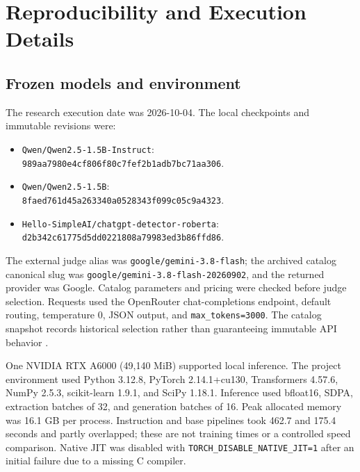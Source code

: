 \section{Reproducibility and Execution Details}\label{sec:reproduce}
\subsection{Frozen models and environment}
The research execution date was 2026-10-04. The local checkpoints and immutable revisions were:
\begin{itemize}[leftmargin=*,itemsep=2pt,topsep=2pt]
\item \texttt{Qwen/Qwen2.5-1.5B-Instruct}:\\\texttt{989aa7980e4cf806f80c7fef2b1adb7bc71aa306}.
\item \texttt{Qwen/Qwen2.5-1.5B}:\\\texttt{8faed761d45a263340a0528343f099c05c9a4323}.
\item \texttt{Hello-SimpleAI/chatgpt-detector-roberta}:\\\texttt{d2b342c61775d5dd0221808a79983ed3b86ffd86}.
\end{itemize}
The external judge alias was \texttt{google/gemini-3.8-flash}; the archived catalog canonical slug was \texttt{google/gemini-3.8-flash-20260902}, and the returned provider was Google. Catalog parameters and pricing were checked before judge selection. Requests used the OpenRouter chat-completions endpoint, default routing, temperature 0, JSON output, and \texttt{max\_tokens=3000}. The catalog snapshot records historical selection rather than guaranteeing immutable API behavior \cite{openrouter}.

One NVIDIA RTX A6000 (49,140 MiB) supported local inference. The project environment used Python 3.12.8, PyTorch 2.14.1+cu130, Transformers 4.57.6, NumPy 2.5.3, scikit-learn 1.9.1, and SciPy 1.18.1. Inference used bfloat16, SDPA, extraction batches of 32, and generation batches of 16. Peak allocated memory was 16.1 GB per process. Instruction and base pipelines took 462.7 and 175.4 seconds and partly overlapped; these are not training times or a controlled speed comparison. Native JIT was disabled with \texttt{TORCH\_DISABLE\_NATIVE\_JIT=1} after an initial failure due to a missing C compiler.

